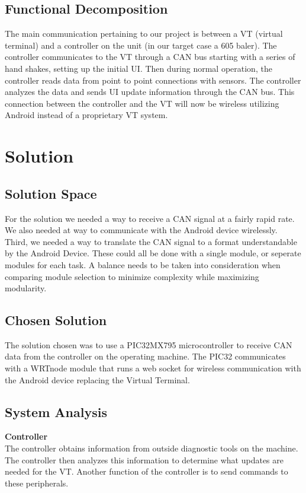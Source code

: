 \documentclass[paper=a4, fontsize=11pt]{scrartcl}
\numberwithin{equation}{section}		%
\numberwithin{figure}{section}			%
\numberwithin{table}{section}				%
\begin{document}
\subsection{Functional Decomposition}
The main communication pertaining to our project is between a VT (virtual terminal) and a controller on the unit (in our target case a 605 baler). The controller communicates to the VT through a CAN bus starting with a series of hand shakes, setting up the initial UI. Then during normal operation, the controller reads data from point to point connections with sensors. The controller analyzes the data and sends UI update information through the CAN bus. This connection between the controller and the VT will now be wireless utilizing Android instead of a proprietary VT system. \\

\pagebreak
\section{Solution}
\subsection{Solution Space}
For the solution we needed a way to receive a CAN signal at a fairly rapid rate. We also needed at way to communicate with the Android device wirelessly. Third, we needed a way to translate the CAN signal to a format understandable by the Android Device. These could all be done with a single module, or seperate modules for each task. A balance needs to be taken into consideration when comparing module selection to minimize complexity while maximizing modularity.  \\

\subsection{Chosen Solution}
The solution chosen was to use a PIC32MX795 microcontroller to receive CAN data from the controller on the operating machine. The PIC32 communicates with a WRTnode module that runs a web socket for wireless communication with the Android device replacing the Virtual Terminal.\\

\subsection{System Analysis}

\textbf{Controller} \\
The controller obtains information from outside diagnostic tools on the machine. The controller then analyzes this information to determine what updates are needed for the VT. Another function of the controller is to send commands to these peripherals. \\
\end{document}
